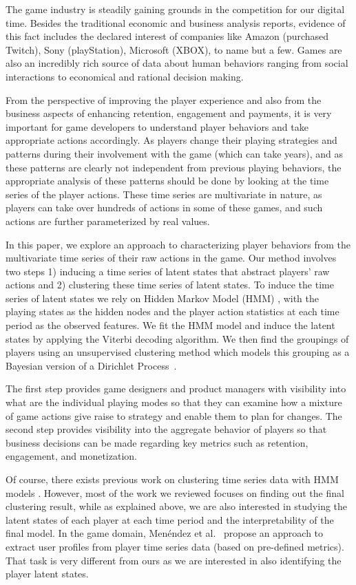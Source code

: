 The game industry is steadily gaining grounds in the competition for our digital time. Besides the traditional economic and business analysis reports, evidence of this fact includes the declared interest of companies like Amazon (purchased Twitch), Sony (playStation), Microsoft (XBOX), to name but a few.  Games are also an incredibly rich source of data about human behaviors ranging from social interactions to economical and rational decision making.

From the perspective of improving the player experience and also from the business aspects of enhancing retention, engagement  and payments, it is very important for game developers to understand  player behaviors and take appropriate actions accordingly. As players change their playing strategies and patterns during their involvement with the game (which can take years), and as these patterns are clearly not independent from previous playing behaviors, the appropriate analysis of these patterns should be done by looking at the time series of the player actions. These time series are multivariate in nature, as players can take over hundreds of actions in some of these games, and such actions are further parameterized by real values.

In this paper, we explore an approach to characterizing player behaviors from the multivariate time series of their raw actions in the game. Our method involves two steps 
1) inducing a time series of latent states that abstract players' raw actions and 2) clustering these time series of latent states.  To induce the time series of latent states we rely on  Hidden Markov Model (HMM) \cite{hmm}, with the playing states as 
the hidden nodes and the player action statistics at each time period as the observed features.  We fit the HMM model and induce the latent  states by applying the Viterbi decoding algorithm.  We then find the groupings of players using an unsupervised clustering method which models this grouping as a Bayesian version of a Dirichlet Process~\cite{dpclustering}.

The first step provides game designers and product managers with visibility into what are the individual playing modes so that they can examine how a mixture of game actions give raise to strategy and enable them to plan for changes.  The second step provides visibility into the aggregate behavior of players so that business decisions can be made regarding key metrics such as retention, engagement, and monetization. 

Of course, there exists previous work on clustering time series data with HMM models
\cite{Bicego2006,bicego2003,coviello2014}. However, most of the work we reviewed focuses on finding
out the final clustering result, while as explained above, we are also interested in studying
the latent states of each player at each time period and the interpretability of the final model. 
In the game domain, Men{\'e}ndez et al.~\cite{menendez2014} propose an approach to extract user profiles from player time series data  (based on pre-defined metrics). That task is very different from ours
as we are interested in also identifying the player latent states. %



